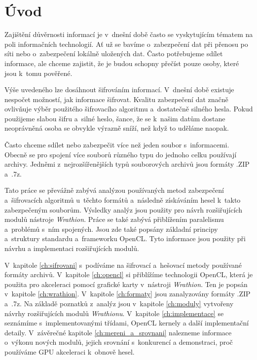 \chapter{Úvod}
Zajištění důvěrnosti informací je v~dnešní době často se vyskytujícím tématem na poli informačních
technologií. Ať už se bavíme o~zabezpečení dat při přenosu po síti nebo o~zabezpečení lokálně
uložených dat. Často potřebujeme sdílet informace, ale chceme zajistit, že je budou schopny
přečíst pouze osoby, které jsou k~tomu pověřené.

 Výše uvedeného lze dosáhnout šifrováním informací. V~dnešní době existuje nespočet možností, jak
informace šifrovat. Kvalitu zabezpečení dat značně ovlivňuje výběr použitého šifrovacího
algoritmu a~dostatečně silného hesla. Pokud použijeme slabou šifru a~silné heslo, šance, že se
k~našim datům dostane neoprávněná osoba se obvykle výrazně sníží, než když to uděláme naopak.

 Často chceme sdílet nebo zabezpečit více než jeden soubor s~informacemi. Obecně se pro
spojení více souborů různého typu do jednoho celku používají archivy. Jedněmi z~nejrozšířenějších
typů souborových archivů jsou formáty .ZIP a~.7z.

 Tato práce se převážně zabývá analýzou používaných metod zabezpečení a~šifrovacích
algoritmů u~těchto formátů a~následně získáváním hesel k~takto zabezpečeným souborům. Výsledky
analýz jsou použity pro návrh rozšiřujících modulů nástroje {\it Wrathion}. Práce se také
zabývá přiblížením paralelismu a~problémů s~ním spojených. Jsou zde také popsány základní
principy a~struktury standardu a~frameworku OpenCL. Tyto informace jsou použity při návrhu a
implementaci rozšiřujících modulů.

 V~kapitole \ref{ch:sifrovani} s~podíváme na šifrovací a~hešovací metody používané formáty
archivů. V~kapitole \ref{ch:opencl} si přiblížíme technologii OpenCL, která je použita pro
akceleraci pomocí grafické karty v~nástroji {\it Wrathion}. Ten je popsán v~kapitole
\ref{ch:wrathion}. V~kapitole \ref{ch:formaty} jsou zanalyzovány formáty .ZIP a~.7z. Na základě
poznatků z~analýz jsou v~kapitole \ref{ch:moduly} vytvořeny návrhy rozšiřujících modulů {\it
Wrathionu}. V~kapitole \ref{ch:implementace} se seznámíme s~implementovanými třídami, OpenCL
kernely a další implementační detaily. V~závěrečné kapitole \ref{ch:mereni_a_srovnani} nalezneme
informace o~výkonu nových modulů, jejich srovnání s~konkurencí a demonstraci, proč používáme GPU
akceleraci k~obnově hesel.

